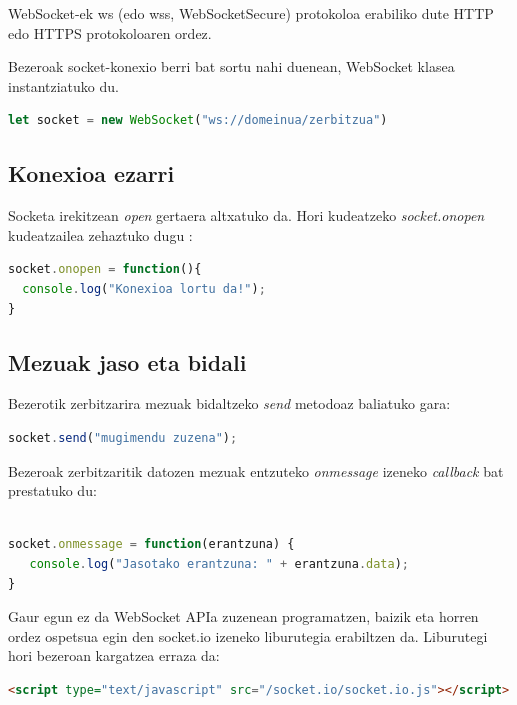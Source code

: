 WebSocket-ek ws (edo wss, WebSocketSecure) protokoloa erabiliko dute HTTP edo HTTPS protokoloaren ordez.

Bezeroak socket-konexio berri bat sortu nahi duenean, WebSocket klasea instantziatuko du.

\begin{lstlisting}[language=JavaScript,numbers=none]
    let socket = new WebSocket("ws://domeinua/zerbitzua")
\end{lstlisting}

\subsection{Konexioa ezarri}

 Socketa irekitzean \textit{open} gertaera altxatuko da. Hori kudeatzeko \textit{socket.onopen} kudeatzailea zehaztuko dugu :

 \begin{lstlisting}[language=JavaScript,numbers=none]
 socket.onopen = function(){
  console.log("Konexioa lortu da!");
}
\end{lstlisting}

\subsection{Mezuak jaso eta bidali}

Bezerotik zerbitzarira mezuak bidaltzeko \textit{send} metodoaz baliatuko gara:

\begin{lstlisting}[language=JavaScript,numbers=none]
socket.send("mugimendu zuzena");
\end{lstlisting}

Bezeroak zerbitzaritik datozen mezuak entzuteko \textit{onmessage} izeneko \textit{callback} bat prestatuko du:

\begin{lstlisting}[language=JavaScript,numbers=none]

socket.onmessage = function(erantzuna) {
   console.log("Jasotako erantzuna: " + erantzuna.data);
}
\end{lstlisting}

Gaur egun ez da WebSocket APIa zuzenean programatzen, baizik eta horren ordez ospetsua egin den socket.io izeneko liburutegia erabiltzen da. Liburutegi hori bezeroan kargatzea erraza da:

\begin{lstlisting}[language=HTML,numbers=none]
    <script type="text/javascript" src="/socket.io/socket.io.js"></script>
\end{lstlisting}

